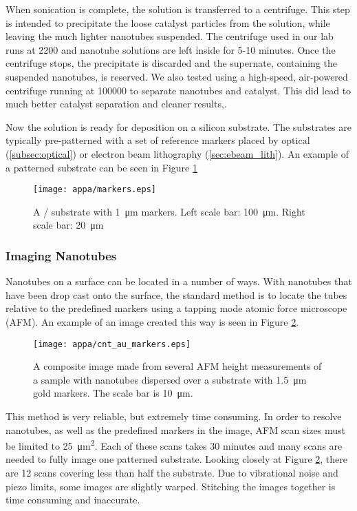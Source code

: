 When sonication is complete, the solution is transferred to a centrifuge. This step is intended to precipitate the loose catalyst particles from the solution, while leaving the much lighter nanotubes suspended. The centrifuge used in our lab runs at \SI{2200}{\rpm} and nanotube solutions are left inside for 5-10 minutes. Once the centrifuge stops, the precipitate is discarded and the supernate, containing the suspended nanotubes, is reserved. We also tested using a high-speed, air-powered centrifuge running at \SI{100000}{\rpm} to separate nanotubes and catalyst. This did lead to much better catalyst separation and cleaner results,.

Now the solution is ready for deposition on a silicon substrate. The substrates are typically pre-patterned with a set of reference markers placed by optical (\ref{subsec:optical}) or electron beam lithography (\ref{sec:ebeam_lith}). An example of a patterned substrate can be seen in Figure \ref{fig:markers}

\begin{figure}
    \centering
    \texttt{[image: appa/markers.eps]}
    \caption{A / substrate with \SI{1}{\micro\meter}  markers. Left scale bar: \SI{100}{\micro\meter}. Right scale bar: \SI{20}{\micro\meter} }
    \label{fig:markers}
\end{figure}

\subsubsection{Imaging Nanotubes}
\label{subsubsec:imaging_disperse}

Nanotubes on a  surface can be located in a number of ways. With nanotubes that have been drop cast onto the surface, the standard method is to locate the tubes relative to the predefined markers using a tapping mode atomic force microscope (AFM). An example of an image created this way is seen in Figure \ref{fig:cnt_au_markers}. 

\begin{figure}
	\centering
	\texttt{[image: appa/cnt\_au\_markers.eps]}
	\caption{A composite image made from several AFM height measurements of a sample with nanotubes dispersed over a  substrate with \SI{1.5}{\micro\meter} gold markers. The scale bar is \SI{10}{\micro\meter}.}
	\label{fig:cnt_au_markers}
\end{figure}

This method is very reliable, but extremely time consuming. In order to resolve nanotubes, as well as the predefined markers in the image, AFM scan sizes must be limited to \SI{25}{\square\micro\meter}. Each of these scans takes 30 minutes and many scans are needed to fully image one patterned substrate. Looking closely at Figure \ref{fig:cnt_au_markers}, there are 12 scans covering less than half the substrate. Due to vibrational noise and piezo limits, some images are slightly warped. Stitching the images together is time consuming and inaccurate.

